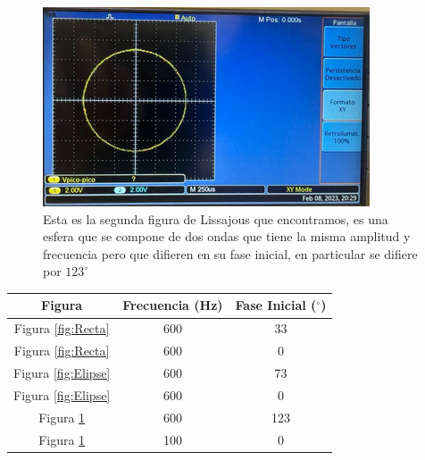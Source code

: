 \documentclass[a4paper, amsfonts, amssymb, amsmath, reprint, showkeys, nofootinbib, twoside]{revtex4-1}
\begin{document}
\begin{figure}
    \centering
    \includegraphics[scale=0.5]{Exp1_Img3.jpeg}
    \caption{Esta es la segunda figura de Lissajous que encontramos, es una esfera que se compone de dos ondas que tiene la misma amplitud y frecuencia pero que difieren en su fase inicial, en particular se difiere por $123^\circ$}
    \label{fig:Circulo}
\end{figure}
\begin{center}
    \begin{tabular}{|c|c|c|}
        \hline
        Figura & Frecuencia (Hz) & Fase Inicial ($^\circ$)\\
        \hline
        Figura \ref{fig:Recta} & 600 & 33\\
        Figura \ref{fig:Recta} & 600 & 0\\
        Figura \ref{fig:Elipse} & 600 & 73\\
        Figura \ref{fig:Elipse} & 600 & 0\\
        Figura \ref{fig:Circulo} & 600 & 123\\
        Figura \ref{fig:Circulo} & 100 & 0\\
        \hline
    \end{tabular}
\end{center}
\end{document}
